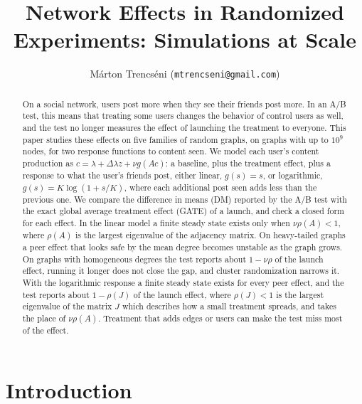 \documentclass[final,5p,times,twocolumn,number]{elsarticle}
\begin{document}
\begin{frontmatter}
\title{Network Effects in Randomized Experiments: Simulations at Scale}
\author{M\'arton Trencs\'eni (\texttt{mtrencseni@gmail.com})}


\begin{abstract}

On a social network, users post more when they see their friends post more. In an A/B test, this means that treating some users changes the behavior of control users as well, and the test no longer measures the effect of launching the treatment to everyone. This paper studies these effects on five families of random graphs, on graphs with up to $10^9$  nodes, for two response functions to content seen. We model each user's content production as $c = \lambda + \Delta\lambda z + \nu g(Ac)$: a baseline, plus the treatment effect, plus a response to what the user's friends post, either linear, $g(s) = s$, or logarithmic, $g(s) = K\log(1 + s/K)$, where each additional post seen adds less than the previous one. We compare the difference in means (DM) reported by the A/B test with the exact global average treatment effect (GATE) of a launch, and check a closed form for each effect. In the linear model a finite steady state exists only when $\nu\rho(A) < 1$, where $\rho(A)$  is the largest eigenvalue of the adjacency matrix. On heavy-tailed graphs a peer effect that looks safe by the mean degree becomes unstable as the graph grows. On graphs with homogeneous degrees the test reports about $1 - \nu\rho$  of the launch effect, running it longer does not close the gap, and cluster randomization narrows it. With the logarithmic response a finite steady state exists for every peer effect, and the test reports about $1 - \rho(J)$  of the launch effect, where $\rho(J) < 1$  is the largest eigenvalue of the matrix $J$  which describes how a small treatment spreads, and takes the place of $\nu\rho(A)$. Treatment that adds edges or users can make the test miss most of the effect.


\end{abstract}
\end{frontmatter}

\section{Introduction}
\end{document}
